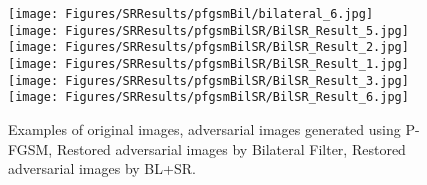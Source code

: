 \documentclass[sn-mathphys]{sn-jnl}%
\theoremstyle{thmstyleone}%
\theoremstyle{thmstyletwo}%
\theoremstyle{thmstylethree}%
\begin{document}
\begin{figure*}
\texttt{[image: Figures/SRResults/pfgsmBil/bilateral\_6.jpg]}\\
\texttt{[image: Figures/SRResults/pfgsmBilSR/BilSR\_Result\_5.jpg]}
\texttt{[image: Figures/SRResults/pfgsmBilSR/BilSR\_Result\_2.jpg]}
\texttt{[image: Figures/SRResults/pfgsmBilSR/BilSR\_Result\_1.jpg]}
\texttt{[image: Figures/SRResults/pfgsmBilSR/BilSR\_Result\_3.jpg]}
\texttt{[image: Figures/SRResults/pfgsmBilSR/BilSR\_Result\_6.jpg]}

\caption{Examples of original images, adversarial images generated using P-FGSM, Restored adversarial images by Bilateral Filter, Restored adversarial images by BL+SR.}
\label{pfgsmresults}
\end{figure*}
\end{document}
